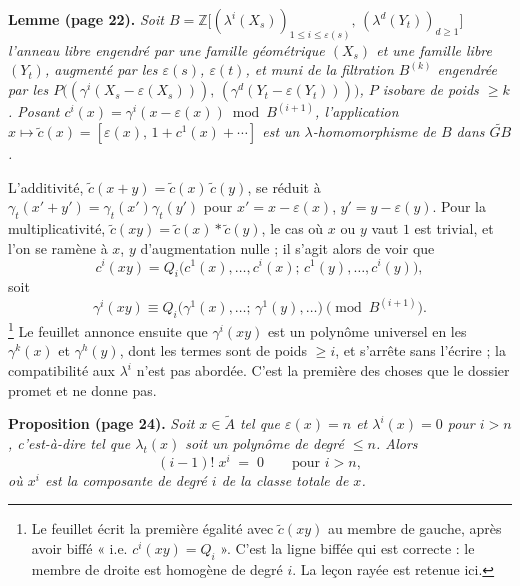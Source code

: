 \documentclass[11pt,a4paper]{article}
\begin{document}
\textbf{Lemme (page 22).} \emph{Soit $B = \mathbb{Z}\bigl[
(\lambda^{i}(X_{s}))_{1 \leqslant i \leqslant \varepsilon(s)},\,
(\lambda^{d}(Y_{t}))_{d \geqslant 1}\bigr]$ l'anneau libre engendré par une
famille géométrique $(X_{s})$ et une famille libre $(Y_{t})$, augmenté par les
$\varepsilon(s)$, $\varepsilon(t)$, et muni de la filtration $B^{(k)}$
engendrée par les $P\bigl((\gamma^{i}(X_{s} - \varepsilon(X_{s}))),\,
(\gamma^{d}(Y_{t} - \varepsilon(Y_{t})))\bigr)$, $P$ isobare de poids
$\geqslant k$. Posant $c^{i}(x) = \gamma^{i}(x - \varepsilon(x)) \bmod
B^{(i+1)}$, l'application $x \mapsto \widetilde{c}(x) = [\varepsilon(x),\, 1 +
c^{1}(x) + \cdots]$ est un $\lambda$-homomorphisme de $B$ dans
$\widetilde{GB}$.}

L'additivité, $\widetilde{c}(x+y) = \widetilde{c}(x)\,\widetilde{c}(y)$, se
réduit à $\gamma_{t}(x' + y') = \gamma_{t}(x')\gamma_{t}(y')$ pour $x' = x -
\varepsilon(x)$, $y' = y - \varepsilon(y)$. Pour la multiplicativité,
$\widetilde{c}(xy) = \widetilde{c}(x) \ast \widetilde{c}(y)$, le cas où $x$ ou
$y$ vaut $1$ est trivial, et l'on se ramène à $x$, $y$ d'augmentation nulle ;
il s'agit alors de voir que
\[
  c^{i}(xy) = Q_{i}\bigl(c^{1}(x), \ldots, c^{i}(x) ;\, c^{1}(y), \ldots,
  c^{i}(y)\bigr),
\]
soit
\[
  \gamma^{i}(xy) \equiv Q_{i}\bigl(\gamma^{1}(x), \ldots ;\, \gamma^{1}(y),
  \ldots\bigr) \pmod{B^{(i+1)}} .
\]
\footnote{Le feuillet écrit la première égalité avec $\widetilde{c}(xy)$ au
membre de gauche, après avoir biffé « i.e. $c^{i}(xy) = Q_{i}$ ». C'est la
ligne biffée qui est correcte : le membre de droite est homogène de degré
$i$. La leçon rayée est retenue ici.} Le feuillet annonce ensuite que
$\gamma^{i}(xy)$ est un polynôme universel en les $\gamma^{k}(x)$ et
$\gamma^{h}(y)$, dont les termes sont de poids $\geqslant i$, et s'arrête sans
l'écrire ; la compatibilité aux $\lambda^{i}$ n'est pas abordée. C'est la
première des choses que le dossier promet et ne donne pas.

\textbf{Proposition (page 24).} \emph{Soit $x \in \widetilde{A}$ tel que
$\varepsilon(x) = n$ et $\lambda^{i}(x) = 0$ pour $i > n$, c'est-à-dire tel que
$\lambda_{t}(x)$ soit un polynôme de degré $\leqslant n$. Alors}
\[
  (i-1)!\;x^{i} \;=\; 0 \qquad \text{pour } i > n ,
\]
\emph{où $x^{i}$ est la composante de degré $i$ de la classe totale de $x$.}
\end{document}
